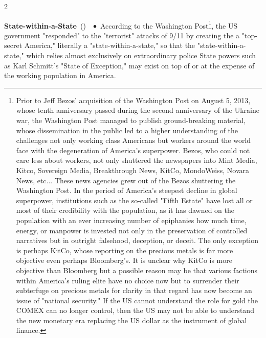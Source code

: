 \documentclass[10pt,a4paper,twoside]{article} %
\newcommand{\entry}[4]{\markboth{#1}{#1}\textbf{#1}\ {(#2)}\ \textit{#3}\ $\bullet$\ {#4}}  %
\begin{document}
\begin{multicols}{2}
{\entry{State-within-a-State} {} {} {According to the Washington Post\footnote{Prior to Jeff Bezos' acquisition of the Washington Post on August 5, 2013, whose tenth anniversary passed during the second anniversary of the Ukraine war, the Washington Post managed to publish ground-breaking material, whose dissemination in the public led to a higher understanding of the challenges not only working class Americans but workers around the world face with the degeneration of America's superpower. Bezos, who could not care less about workers, not only shuttered the newspapers into Mint Media, Kitco, Sovereign Media, Breakthrough News, KitCo, MondoWeiss, Novara News, etc... These news agencies grew out of the Bezos shuttering the Washington Post. In the period of America's steepest decline in global superpower, institutions such as the so-called "Fifth Estate" have lost all or most of their credibility with the population, as it has dawned on the population with an ever increasing number of epiphanies how much time, energy, or manpower is invested not only in the preservation of controlled narratives but in outright falsehood, deception, or deceit. The only exception is perhaps KitCo, whose reporting on the precious metals is far more objective even perhaps Bloomberg's. It is unclear why KitCo is more objective than Bloomberg but a possible reason may be that various factions within America's ruling elite have no choice now but to surrender their subterfuge on precious metals for clarity in that regard has now become an issue of "national security." If the US cannot understand the role for gold the COMEX can no longer control, then the US may not be able to understand the new monetary era replacing the US dollar as the instrument of global finance.}, the US government "responded" to the "terrorist" attacks of 9/11 by creating the a "top-secret America," literally a "state-within-a-state," so that the "state-within-a-state," which relies almost exclusively on extraordinary police State powers such as Karl Schmitt's "State of Exception," may exist on top of or at the expense of the working population in America. 
}}
\end{multicols}
\end{document}
